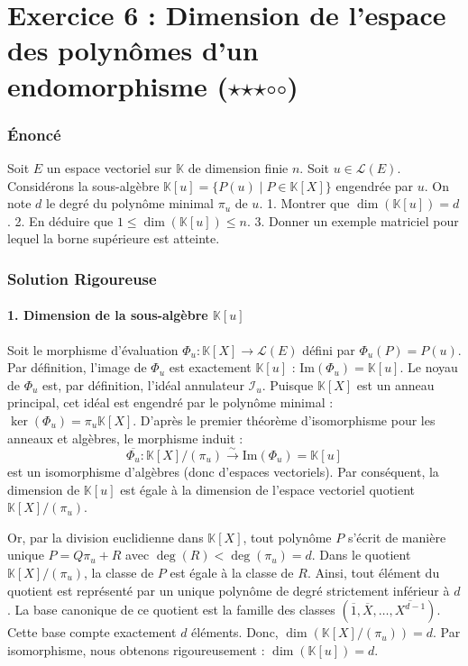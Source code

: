\documentclass[11pt,a4paper]{article}
\begin{document}
\part{Exercice 6 : Dimension de l'espace des polynômes d'un endomorphisme ($\star$$\star$$\star$$\circ$$\circ$)}

\section{Énoncé}

Soit $E$ un espace vectoriel sur $\mathbb{K}$ de dimension finie $n$. Soit $u \in \mathcal{L}(E)$.
Considérons la sous-algèbre $\mathbb{K}[u] = \{ P(u) \mid P \in \mathbb{K}[X] \}$ engendrée par $u$.
On note $d$ le degré du polynôme minimal $\pi_u$ de $u$.
1. Montrer que $\dim(\mathbb{K}[u]) = d$.
2. En déduire que $1 \le \dim(\mathbb{K}[u]) \le n$.
3. Donner un exemple matriciel pour lequel la borne supérieure est atteinte.

\section{Solution Rigoureuse}

\subsection{1. Dimension de la sous-algèbre $\mathbb{K}[u]$}
Soit le morphisme d'évaluation $\Phi_u : \mathbb{K}[X] \to \mathcal{L}(E)$ défini par $\Phi_u(P) = P(u)$.
Par définition, l'image de $\Phi_u$ est exactement $\mathbb{K}[u]$ : $\text{Im}(\Phi_u) = \mathbb{K}[u]$.
Le noyau de $\Phi_u$ est, par définition, l'idéal annulateur $\mathcal{I}_u$. Puisque $\mathbb{K}[X]$ est un anneau principal, cet idéal est engendré par le polynôme minimal : $\ker(\Phi_u) = \pi_u \mathbb{K}[X]$.
D'après le premier théorème d'isomorphisme pour les anneaux et algèbres, le morphisme induit :
$$\overline{\Phi_u} : \mathbb{K}[X] / (\pi_u) \xrightarrow{\sim} \text{Im}(\Phi_u) = \mathbb{K}[u]$$
est un isomorphisme d'algèbres (donc d'espaces vectoriels).
Par conséquent, la dimension de $\mathbb{K}[u]$ est égale à la dimension de l'espace vectoriel quotient $\mathbb{K}[X] / (\pi_u)$.

Or, par la division euclidienne dans $\mathbb{K}[X]$, tout polynôme $P$ s'écrit de manière unique $P = Q \pi_u + R$ avec $\deg(R) < \deg(\pi_u) = d$.
Dans le quotient $\mathbb{K}[X] / (\pi_u)$, la classe de $P$ est égale à la classe de $R$. Ainsi, tout élément du quotient est représenté par un unique polynôme de degré strictement inférieur à $d$.
La base canonique de ce quotient est la famille des classes $(\overline{1}, \overline{X}, \dots, \overline{X^{d-1}})$.
Cette base compte exactement $d$ éléments.
Donc, $\dim(\mathbb{K}[X] / (\pi_u)) = d$.
Par isomorphisme, nous obtenons rigoureusement : $\dim(\mathbb{K}[u]) = d$.
\end{document}
